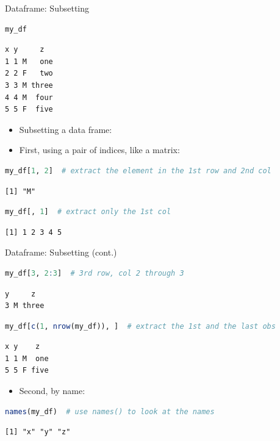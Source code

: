 \begin{frame}[fragile]{Dataframe: Subsetting}
\begin{lstlisting}[language=R]
my_df
\end{lstlisting}
\begin{lstlisting}[style=output]
  x y     z
1 1 M   one
2 2 F   two
3 3 M three
4 4 M  four
5 5 F  five
\end{lstlisting}
\begin{itemize}
  \item Subsetting a data frame:
  \item First, using a pair of indices, like a matrix:
\end{itemize}
\begin{lstlisting}[language=R]
my_df[1, 2]  # extract the element in the 1st row and 2nd col
\end{lstlisting}
\begin{lstlisting}[style=output]
[1] "M"
\end{lstlisting}
\begin{lstlisting}[language=R]
my_df[, 1]  # extract only the 1st col
\end{lstlisting}
\begin{lstlisting}[style=output]
[1] 1 2 3 4 5
\end{lstlisting}
\end{frame}

\begin{frame}[fragile]{Dataframe: Subsetting (cont.)}
\begin{lstlisting}[language=R]
my_df[3, 2:3]  # 3rd row, col 2 through 3
\end{lstlisting}
\begin{lstlisting}[style=output]
  y     z
3 M three
\end{lstlisting}
\begin{lstlisting}[language=R]
my_df[c(1, nrow(my_df)), ]  # extract the 1st and the last obs
\end{lstlisting}
\begin{lstlisting}[style=output]
  x y    z
1 1 M  one
5 5 F five
\end{lstlisting}
\begin{itemize}
  \item Second, by name:
\end{itemize}
\begin{lstlisting}[language=R]
names(my_df)  # use names() to look at the names
\end{lstlisting}
\begin{lstlisting}[style=output]
[1] "x" "y" "z"
\end{lstlisting}
\end{frame}

